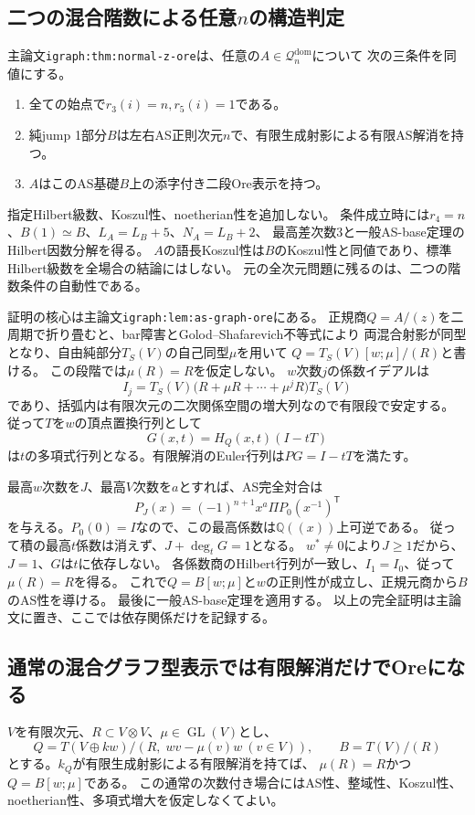 \documentclass[11pt,a4paper]{ltjsarticle}
\begin{document}
\subsection{二つの混合階数による任意\texorpdfstring{$n$}{n}の構造判定}
\label{note:normal-z-ore}
主論文\texttt{igraph:thm:normal-z-ore}は、任意の$A\in\mathcal Q_n^{\mathrm{dom}}$について
次の三条件を同値にする。
\begin{enumerate}
\item 全ての始点で$r_3(i)=n,r_5(i)=1$である。
\item 純jump 1部分$B$は左右AS正則次元$n$で、有限生成射影による有限AS解消を持つ。
\item $A$はこのAS基礎$B$上の添字付き二段Ore表示を持つ。
\end{enumerate}
指定Hilbert級数、Koszul性、noetherian性を追加しない。
条件成立時には$r_4=n$、$B(1)\simeq B$、$L_A=L_B+5$、$N_A=L_B+2$、
最高差次数3と一般AS-base定理のHilbert因数分解を得る。
$A$の語長Koszul性は$B$のKoszul性と同値であり、標準Hilbert級数を全場合の結論にはしない。
元の全次元問題に残るのは、二つの階数条件の自動性である。

証明の核心は主論文\texttt{igraph:lem:as-graph-ore}にある。
正規商$Q=A/(z)$を二周期で折り畳むと、bar障害とGolod--Shafarevich不等式により
両混合射影が同型となり、自由純部分$T_S(V)$の自己同型$\mu$を用いて
$Q=T_S(V)[w;\mu]/(R)$と書ける。
この段階では$\mu(R)=R$を仮定しない。
$w$次数$j$の係数イデアルは
\[
I_j=T_S(V)\bigl(R+\mu R+\cdots+\mu^jR\bigr)T_S(V)
\]
であり、括弧内は有限次元の二次関係空間の増大列なので有限段で安定する。
従って$T$を$w$の頂点置換行列として
\[
G(x,t)=H_Q(x,t)(I-tT)
\]
は$t$の多項式行列となる。有限解消のEuler行列は$PG=I-tT$を満たす。

最高$w$次数を$J$、最高$V$次数を$a$とすれば、AS完全対合は
\[
P_J(x)=(-1)^{n+1}x^a\Pi P_0(x^{-1})^{\mathsf T}
\]
を与える。$P_0(0)=I$なので、この最高係数は$\mathbb Q((x))$上可逆である。
従って積の最高$t$係数は消えず、$J+\deg_tG=1$となる。
$w^*\ne0$により$J\ge1$だから、$J=1$、$G$は$t$に依存しない。
各係数商のHilbert行列が一致し、$I_1=I_0$、従って$\mu(R)=R$を得る。
これで$Q=B[w;\mu]$と$w$の正則性が成立し、正規元商から$B$のAS性を導ける。
最後に一般AS-base定理を適用する。
以上の完全証明は主論文に置き、ここでは依存関係だけを記録する。

\subsection{通常の混合グラフ型表示では有限解消だけでOreになる}
\label{note:ordinary-graph-finite-res}
$V$を有限次元、$R\subset V\otimes V$、$\mu\in\operatorname{GL}(V)$とし、
\[
Q=T(V\oplus kw)/(R,\;wv-\mu(v)w\ (v\in V)),\qquad B=T(V)/(R)
\]
とする。$k_Q$が有限生成射影による有限解消を持てば、
$\mu(R)=R$かつ$Q=B[w;\mu]$である。
この通常の次数付き場合にはAS性、整域性、Koszul性、noetherian性、多項式増大を仮定しなくてよい。
\end{document}
